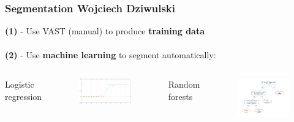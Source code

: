 \documentclass[10pt]{beamer}
\begin{document}
\begin{frame}[fragile]
\frametitle{Segmentation  \hspace{0pt plus 1 filll} \small{Wojciech Dziwulski}}


\begin{center}
\textbf{(1)} - Use VAST (manual) to produce \textbf{training data} \cite{kasthuri2015saturated} \\
$ $ \\
\textbf{(2)} - Use \textbf{machine learning} to segment automatically:
\end{center}
\begin{columns}[T,onlytextwidth]
	\centering
	Logistic regression
	\begin{figure}
			\centering
			\includegraphics[width=.20\paperwidth]{logistic_regression.eps}
	\end{figure}
	\centering
	Random forests
	\begin{figure}
		\centering
		\includegraphics[width=.20\paperwidth]{decision_tree.pdf}

\end{figure}
\end{columns}
\end{frame}
\end{document}
